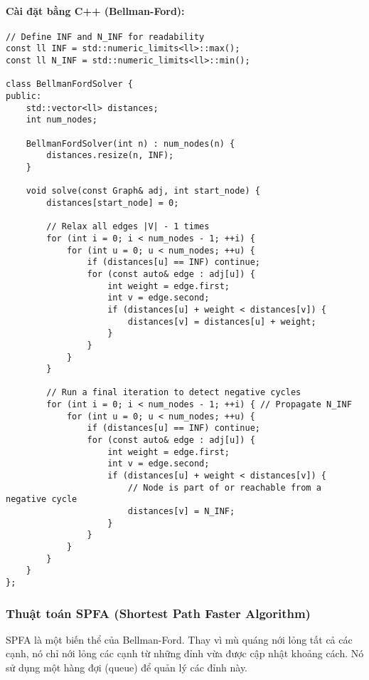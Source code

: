 \documentclass[a4paper,12pt]{article}
\begin{document}
\paragraph{Cài đặt bằng C++ (Bellman-Ford):}
\begin{lstlisting}[style=cppstyle, caption={Cài đặt Bellman-Ford trong C++, có phát hiện chu trình âm.}, label={lst:cpp_bellmanford}]
// Define INF and N_INF for readability
const ll INF = std::numeric_limits<ll>::max();
const ll N_INF = std::numeric_limits<ll>::min();

class BellmanFordSolver {
public:
    std::vector<ll> distances;
    int num_nodes;

    BellmanFordSolver(int n) : num_nodes(n) {
        distances.resize(n, INF);
    }

    void solve(const Graph& adj, int start_node) {
        distances[start_node] = 0;

        // Relax all edges |V| - 1 times
        for (int i = 0; i < num_nodes - 1; ++i) {
            for (int u = 0; u < num_nodes; ++u) {
                if (distances[u] == INF) continue;
                for (const auto& edge : adj[u]) {
                    int weight = edge.first;
                    int v = edge.second;
                    if (distances[u] + weight < distances[v]) {
                        distances[v] = distances[u] + weight;
                    }
                }
            }
        }

        // Run a final iteration to detect negative cycles
        for (int i = 0; i < num_nodes - 1; ++i) { // Propagate N_INF
            for (int u = 0; u < num_nodes; ++u) {
                if (distances[u] == INF) continue;
                for (const auto& edge : adj[u]) {
                    int weight = edge.first;
                    int v = edge.second;
                    if (distances[u] + weight < distances[v]) {
                        // Node is part of or reachable from a negative cycle
                        distances[v] = N_INF;
                    }
                }
            }
        }
    }
};
\end{lstlisting}

\subsubsection{Thuật toán SPFA (Shortest Path Faster Algorithm)}
SPFA là một biến thể của Bellman-Ford. Thay vì mù quáng nới lỏng tất cả các cạnh, nó chỉ nới lỏng các cạnh từ những đỉnh vừa được cập nhật khoảng cách. Nó sử dụng một hàng đợi (queue) để quản lý các đỉnh này.
\end{document}
